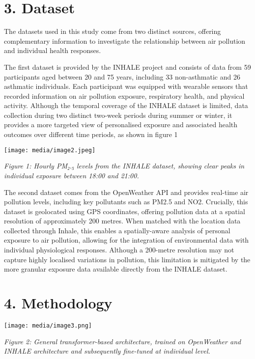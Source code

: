 \documentclass[
]{article}
\begin{document}
\hypertarget{dataset}{%
\section{3. Dataset}\label{dataset}}

The datasets used in this study come from two distinct sources, offering
complementary information to investigate the relationship between air
pollution and individual health responses.

The first dataset is provided by the INHALE project and consists of data
from 59 participants aged between 20 and 75 years, including 33
non-asthmatic and 26 asthmatic individuals. Each participant was
equipped with wearable sensors that recorded information on air
pollution exposure, respiratory health, and physical activity. Although
the temporal coverage of the INHALE dataset is limited, data collection
during two distinct two-week periods during summer or winter, it
provides a more targeted view of personalised exposure and associated
health outcomes over different time periods, as shown in figure 1

\texttt{[image: media/image2.jpeg]}

\emph{Figure 1: Hourly PM₂.₅ levels from the INHALE dataset, showing
clear peaks in individual exposure between 18:00 and 21:00.}

The second dataset comes from the OpenWeather API and provides real-time
air pollution levels, including key pollutants such as PM2.5 and NO2.
Crucially, this dataset is geolocated using GPS coordinates, offering
pollution data at a spatial resolution of approximately 200 metres. When
matched with the location data collected through Inhale, this enables a
spatially-aware analysis of personal exposure to air pollution, allowing
for the integration of environmental data with individual physiological
responses. Although a 200-metre resolution may not capture highly
localised variations in pollution, this limitation is mitigated by the
more granular exposure data available directly from the INHALE dataset.

\hypertarget{methodology}{%
\section{4. Methodology}\label{methodology}}

\texttt{[image: media/image3.png]}

\emph{Figure 2: General transformer-based architecture, trained on
OpenWeather and INHALE architecture and subsequently fine-tuned at
individual level.}
\end{document}
